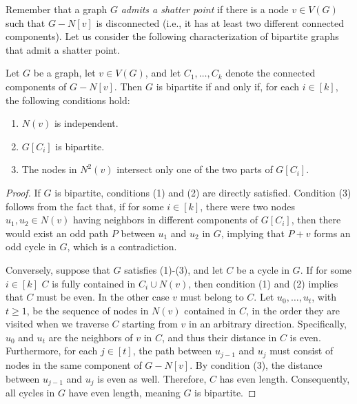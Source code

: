 \documentclass[11pt]{article}
\begin{document}
Remember  that a graph \( G \) \emph{admits a shatter point} if there is a node \( v \in V(G) \) such that \( G - N[v] \) is disconnected (i.e., it has at least two different connected components). Let us consider the following characterization of bipartite graphs that admit a shatter point.

\begin{lemma}\label{lem:bipshatter}
Let \( G \) be a graph, let \( v\in V(G) \), and let \( C_1, \dots, C_k \) denote the connected components of \( G - N[v] \). Then \( G \) is bipartite if and only if, for each \( i \in [k] \), the following conditions hold:
\begin{enumerate}
    \item \( N(v) \) is independent.
    \item \( G[C_i] \) is bipartite.
    \item The nodes in \( N^2(v) \) intersect only one of the two parts of \( G[C_i] \).
\end{enumerate}
\end{lemma}

\begin{proof}
If \( G \) is bipartite, conditions (1) and (2) are directly satisfied. Condition (3) follows from the fact that, if for some \( i \in [k] \), there were two nodes \( u_1, u_2 \in N(v) \) having neighbors in different components of \( G[C_i] \), then there would exist an odd path \( P \) between \( u_1 \) and \( u_2 \) in \( G \), implying that \( P + v \) forms an odd cycle in \( G \), which is a contradiction.

Conversely, suppose that \( G \) satisfies (1)-(3), and let \( C \) be a cycle in \( G \). If for some $i\in[k]$ \( C \) is fully contained in \( C_i \cup N(v)\), then condition (1) and (2) implies that \( C \) must be even. In the other case \( v \) must belong to \( C \). Let \( u_0, \dots, u_t \), with \( t \geq 1 \), be the sequence of nodes in \( N(v) \) contained in \( C \), in the order they are visited when we traverse \( C \) starting from \( v \) in an arbitrary direction. Specifically, \( u_0 \) and \( u_t \) are the neighbors of \( v \) in \( C \), and thus their distance in \( C \) is even. Furthermore, for each \( j \in [t] \), the path between \( u_{j-1} \) and \( u_j \) must consist of nodes in the same component of \( G - N[v] \). By condition (3), the distance between \( u_{j-1} \) and \( u_j \) is even as well. Therefore, \( C \) has even length. Consequently, all cycles in \( G \) have even length, meaning \( G \) is bipartite.
\end{proof}
\end{document}
